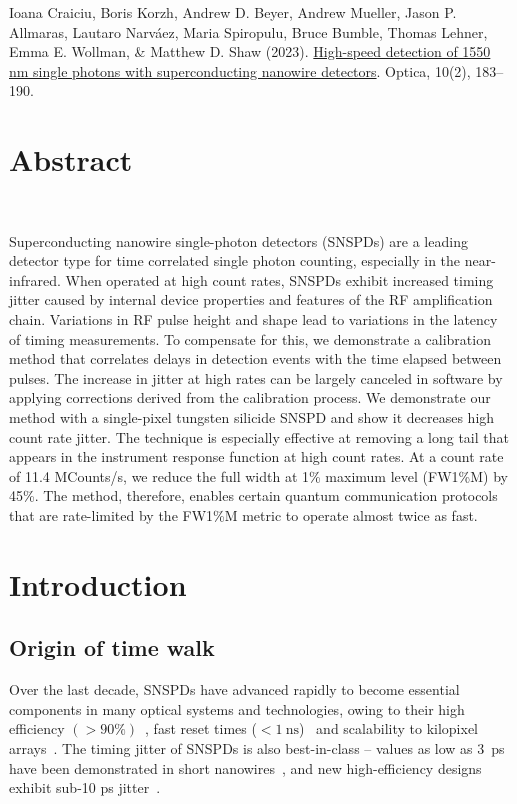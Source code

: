 \documentclass[11pt]{caltech_thesis} %
\begin{document}
Ioana Craiciu, Boris Korzh, Andrew D. Beyer, Andrew Mueller, Jason P. Allmaras, Lautaro Narváez, Maria Spiropulu, Bruce Bumble, Thomas Lehner, Emma E. Wollman, \& Matthew D. Shaw (2023). \href{https://opg.optica.org/optica/fulltext.cfm?uri=optica-10-2-183\&id=525546}{High-speed detection of 1550 nm single photons with superconducting nanowire detectors}. Optica, 10(2), 183--190.

\hypertarget{abstract-1}{%
\section{Abstract}\label{abstract-1}}

~~~~~

Superconducting nanowire single-photon detectors (SNSPDs) are a leading detector type for time correlated single photon counting, especially in the near-infrared. When operated at high count rates, SNSPDs exhibit increased timing jitter caused by internal device properties and features of the RF amplification chain. Variations in RF pulse height and shape lead to variations in the latency of timing measurements. To compensate for this, we demonstrate a calibration method that correlates delays in detection events with the time elapsed between pulses. The increase in jitter at high rates can be largely canceled in software by applying corrections derived from the calibration process. We demonstrate our method with a single-pixel tungsten silicide SNSPD and show it decreases high count rate jitter. The technique is especially effective at removing a long tail that appears in the instrument response function at high count rates. At a count rate of 11.4 MCounts/s, we reduce the full width at 1\% maximum level (FW1\%M) by 45\%. The method, therefore, enables certain quantum communication protocols that are rate-limited by the FW1\%M metric to operate almost twice as fast.

\hypertarget{introduction-2}{%
\section{Introduction}\label{introduction-2}}

\hypertarget{origin-of-time-walk}{%
\subsection{Origin of time walk}\label{origin-of-time-walk}}

Over the last decade, SNSPDs have advanced rapidly to become essential components in many optical systems and technologies, owing to their high efficiency $(>90\%)$~\autocite{99.5_Chang_2021,reddy2020superconducting}, fast reset times ($< 1~\mathrm{ns}$)~\autocite{Vetter2016Cavity} and scalability to kilopixel arrays~\autocite{Wollman2019}. The timing jitter of SNSPDs is also best-in-class -- values as low as 3~ps have been demonstrated in short nanowires~\autocite{Korzh2020}, and new high-efficiency designs exhibit sub-10 ps jitter~\autocite{EsmaeilZadeh2020,Colangelo2021}.
\end{document}
